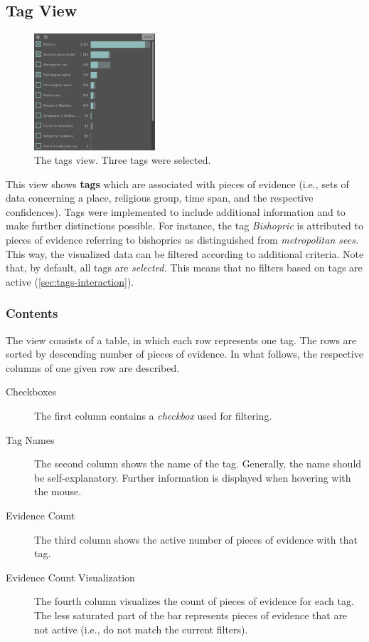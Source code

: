 \subsection{Tag View}
\label{sec:tags}

\begin{figure}[tb]
  \centering
  \includegraphics[width=0.4\textwidth]{../src/assets/visualization-documentation/tags.png}
  \caption{
    The tags view.
    Three tags were selected.
  }
  \label{fig:tags}
\end{figure}

This view shows \textbf{tags} which are associated with pieces of evidence (i.e., sets of data concerning a place, religious group, time span, and the respective confidences).
Tags were implemented to include additional information and to make further distinctions possible.
For instance, the tag \emph{Bishopric} is attributed to pieces of evidence referring to bishoprics as distinguished from \emph{metropolitan sees.}
This way, the visualized data can be filtered according to additional criteria.
Note that, by default, all tags are \emph{selected.}
This means that no filters based on tags are active (\cref{sec:tags-interaction}).


\subsubsection{Contents}

The view consists of a table, in which each row represents one tag.
The rows are sorted by descending number of pieces of evidence.
In what follows, the respective columns of one given row are described.

\begin{description}
  \item[Checkboxes]
    The first column contains a \emph{checkbox} used for filtering.

  \item[Tag Names]
    The second column shows the name of the tag.
    Generally, the name should be self-explanatory.
    Further information is displayed when hovering with the mouse.

  \item[Evidence Count]
    The third column shows the active number of pieces of evidence with that tag.

  \item[Evidence Count Visualization]
    The fourth column visualizes the count of pieces of evidence for each tag.
    The less saturated part of the bar represents pieces of evidence that are not active (i.e., do not match the current filters).
\end{description}

